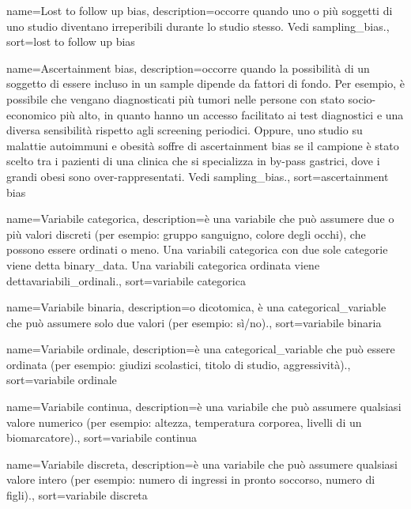 {
	 name={Lost to follow up bias},
	 description={occorre quando uno o pi\`u soggetti di uno studio diventano irreperibili durante lo studio stesso. Vedi \gls{sampling_bias}.},
	 sort={lost to follow up bias}
}

{
	 name={Ascertainment bias},
	 description={occorre quando la possibilit\`a di un soggetto di essere incluso in un \gls{sample} dipende da fattori di fondo. Per esempio, \`e possibile che vengano diagnosticati pi\`u tumori nelle persone con stato socio-economico pi\`u alto, in quanto hanno un accesso facilitato ai test diagnostici e una diversa sensibilit\`a rispetto agli screening periodici. Oppure, uno studio su malattie autoimmuni e obesit\`a soffre di ascertainment bias se il campione \`e stato scelto tra i pazienti di una clinica che si specializza in by-pass gastrici, dove i grandi obesi sono over-rappresentati. Vedi \gls{sampling_bias}.},
	 sort={ascertainment bias}
}




{
	 name={Variabile categorica},
	 description={\`e una variabile che pu\`o assumere due o pi\`u valori discreti (per esempio: gruppo sanguigno, colore degli occhi), che possono essere ordinati o meno. Una variabili categorica con due sole categorie viene detta \gls{binary_data}. Una variabili categorica ordinata viene detta\gls{variabili_ordinali}.},
	 sort={variabile categorica}
}

{
	 name={Variabile binaria},
	 description={o dicotomica, \`e una \gls{categorical_variable} che pu\`o assumere solo due valori (per esempio: s\`i/no).},
	 sort={variabile binaria}
}

{
	 name={Variabile ordinale},
	 description={\`e una \gls{categorical_variable} che pu\`o essere ordinata (per esempio: giudizi scolastici, titolo di studio, aggressivit\`a).},
	 sort={variabile ordinale}
}

{
	 name={Variabile continua},
	 description={\`e una variabile che pu\`o assumere qualsiasi valore numerico (per esempio: altezza, temperatura corporea, livelli di un biomarcatore).},
	 sort={variabile continua}
}

{
	 name={Variabile discreta},
	 description={\`e una variabile che pu\`o assumere qualsiasi valore intero (per esempio: numero di ingressi in pronto soccorso, numero di figli).},
	 sort={variabile discreta}
}



